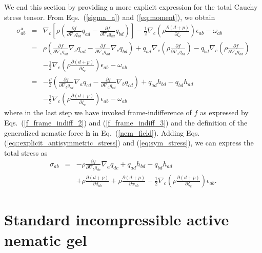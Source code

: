 \documentclass[12pt]{iopart}
\begin{document}
We end this section by providing a more explicit expression for the total Cauchy stress tensor. From Eqs.~(\ref{sigma_a}) and (\ref{eq:moment}), we obtain
	\begin{eqnarray}
		{\sigma}_{ab}^{\text{a}}  & = &\nabla_c \left[\rho\left( \frac{\partial f}{\partial \nabla_c q_{bd}}q_{ad} - \frac{\partial f}{\partial \nabla_c q_{ad}}q_{bd}   \right) \right]-\frac{1}{2}\nabla_c \left( \rho \frac{\partial (  d+p)}{\partial \zeta_c}\right)\epsilon_{ab} - \omega_{ab} \nonumber \\
		 & = &  \rho \left( \frac{\partial f}{\partial \nabla_c q_{bd}} \nabla_c q_{ad} -   \frac{\partial f}{\partial \nabla_c q_{ad}} \nabla_c q_{bd}  \right) + q_{ad} \nabla_c\left( \rho  \frac{\partial f}{\partial \nabla_c q_{bd}}\right) -  q_{bd} \nabla_c\left( \rho  \frac{\partial f}{\partial \nabla_c q_{ad}}\right) \nonumber \\
		 && -\frac{1}{2}\nabla_c \left( \rho \frac{\partial (  d+p)}{\partial \zeta_c}\right)\epsilon_{ab} - \omega_{ab} \nonumber \\
		 & = &  - \frac{\rho}{2}  \left( \frac{\partial f}{\partial \nabla_b q_{cd}} \nabla_a q_{cd} -   \frac{\partial f}{\partial \nabla_a q_{cd}} \nabla_b q_{cd}  \right) + q_{ad} h_{bd} -  q_{bd} h_{ad} \nonumber \\
		 && -\frac{1}{2}\nabla_c \left( \rho \frac{\partial (  d+p)}{\partial \zeta_c}\right)\epsilon_{ab} - \omega_{ab} \label{eq::explicit_antisymmetric_stress}
\end{eqnarray}
where in the last step we have invoked frame-indifference of $f$ as expressed by Eqs.~(\ref{f_frame_indiff_2}) and (\ref{f_frame_indiff_3}) and the definition of the generalized nematic force $\bm{h}$ in Eq.~(\ref{nem_field}). Adding Eqs. (\ref{eq::explicit_antisymmetric_stress}) and 	(\ref{eq:sym_stress}), we can express the total stress as 
	\begin{eqnarray}
		\label{total_stress}
		{\sigma}_{ab} & = &  -\rho\frac{\partial  f}{\partial \nabla_b q_{dc}} \nabla_a q_{dc}  +   q_{ad}  h_{bd} - q_{bd} h_{ad}   \nonumber  \\ 
		&& + \rho \frac{\partial (d+p)}{\partial d_{ab}} + \rho \frac{\partial (d+p)}{\partial w_{ab}} -  \frac{1}{2} \nabla_c \left(\rho\frac{\partial (  d+p)}{\partial \zeta_c} \right) \epsilon_{ab}   .
	\end{eqnarray}


	\section{Standard incompressible active nematic gel} \label{sec_2_bis}
	
\end{document}
